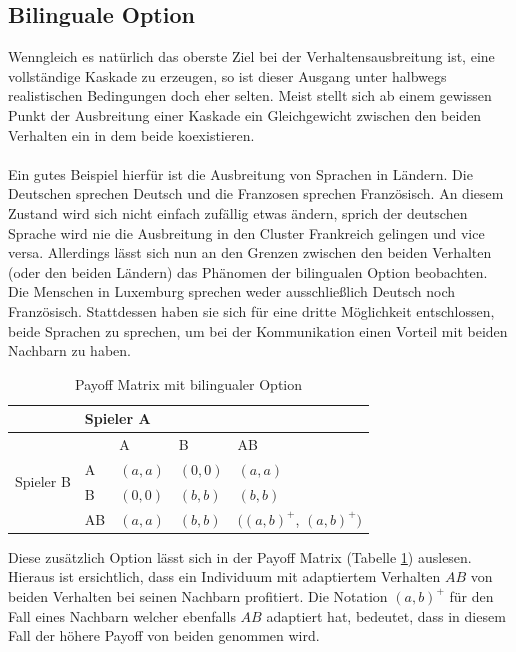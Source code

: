 \documentclass[12pt]{article}
\begin{document}
\subsection{Bilinguale Option}
Wenngleich es natürlich das oberste Ziel bei der Verhaltensausbreitung ist, eine vollständige Kaskade zu erzeugen, so ist dieser Ausgang unter halbwegs realistischen Bedingungen doch eher selten. Meist stellt sich ab einem gewissen Punkt der Ausbreitung einer Kaskade ein Gleichgewicht zwischen den beiden Verhalten ein in dem beide koexistieren.\\\\
Ein gutes Beispiel hierfür ist die Ausbreitung von Sprachen in Ländern. Die Deutschen sprechen Deutsch und die Franzosen sprechen Französisch. An diesem Zustand wird sich nicht einfach zufällig etwas ändern, sprich der deutschen Sprache wird nie die Ausbreitung in den Cluster Frankreich gelingen und vice versa. Allerdings lässt sich nun an den Grenzen zwischen den beiden Verhalten (oder den beiden Ländern) das Phänomen der bilingualen Option beobachten. Die Menschen in Luxemburg sprechen weder ausschließlich Deutsch noch Französisch. Stattdessen haben sie sich für eine dritte Möglichkeit entschlossen, beide Sprachen zu sprechen, um bei der Kommunikation einen Vorteil mit beiden Nachbarn zu haben.
\begin{table}[h]
\centering
\caption{Payoff Matrix mit bilingualer Option}
\label{table_payoffBi}
\begin{tabular}{|l|l|l|l|l|}
\hline
                           & \multicolumn{4}{l|}{Spieler A}                                          \\ \hline
\multirow{4}{*}{Spieler B} &    & A     & B     & AB                                                 \\ \cline{2-5} 
                           & A  & $(a,a)$ & $(0,0)$ & $(a,a)$                                              \\ \cline{2-5} 
                           & B  & $(0,0)$ & $(b,b)$ & $(b,b)$                                              \\ \cline{2-5} 
                           & AB & $(a,a)$ & $(b,b)$ & $((a,b)^+$, $(a,b)^+)$ \\ \hline
\end{tabular}
\end{table}
Diese zusätzlich Option lässt sich in der Payoff Matrix (Tabelle \ref{table_payoffBi}) auslesen. Hieraus ist ersichtlich, dass ein Individuum mit adaptiertem Verhalten $AB$ von beiden Verhalten bei seinen Nachbarn profitiert. Die Notation $(a,b)^+$ für den Fall eines Nachbarn welcher ebenfalls $AB$ adaptiert hat, bedeutet, dass in diesem Fall der höhere Payoff von beiden genommen wird.\\
\end{document}
